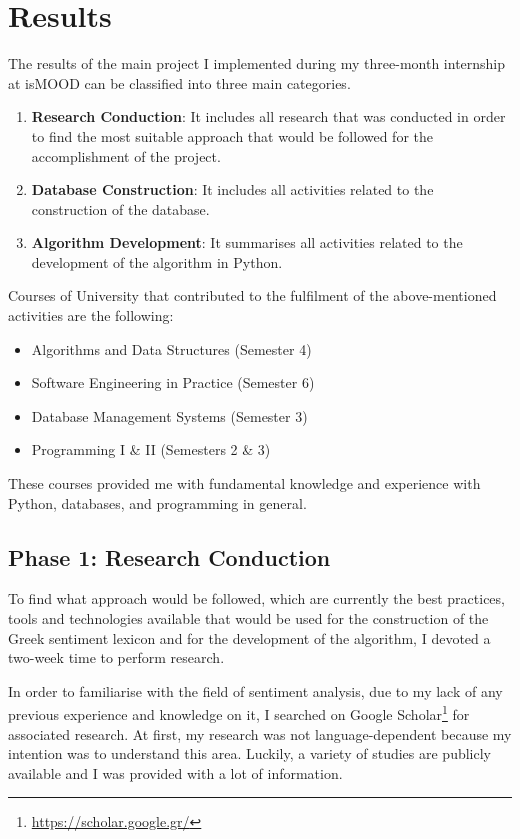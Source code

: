 \section{Results}
\label{sec:results}

The results of the main project I implemented
during my three-month internship at isMOOD can be classified
into three main categories.

\begin{enumerate}
  \item \textbf{Research Conduction}: It includes all research that was conducted
  in order to find the most suitable approach
  that would be followed for the accomplishment of the project. 
  \item \textbf{Database Construction}: It includes all activities related to the construction of the database.
  \item \textbf{Algorithm Development}: It summarises all activities related to the development
  of the algorithm in Python.
\end{enumerate}

Courses of University that contributed to the fulfilment
of the above-mentioned activities are the following:

\begin{itemize}
 \item Algorithms and Data Structures (Semester 4)
 \item Software Engineering in Practice (Semester 6)
 \item Database Management Systems (Semester 3)
 \item Programming I \& II (Semesters 2 \& 3)
\end{itemize}

These courses provided me with fundamental knowledge and experience
with Python, databases, and programming in general.

\subsection{Phase 1: Research Conduction}
\label{subsec:research}

To find what approach would be followed,
which are currently the best practices, tools and technologies available
that would be used for the construction of the Greek sentiment lexicon
and for the development of the algorithm,
I devoted a two-week time to perform research.

In order to familiarise with the field of sentiment analysis,
due to my lack of any previous experience and knowledge on it,
I searched on Google Scholar\footnote{\url {https://scholar.google.gr/}}
for associated research.
At first, my research was not language-dependent
because my intention was to understand this area.
Luckily, a variety of studies are publicly available
and I was provided with a lot of information.

